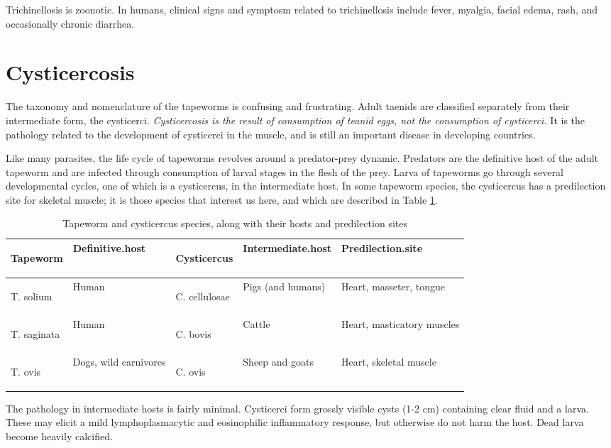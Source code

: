 \documentclass[openany]{book}
\begin{document}
Trichinellosis is zoonotic. In humans, clinical signs and symptosm
related to trichinellosis include fever, myalgia, facial edema, rash,
and occasionally chronic diarrhea.

\section{Cysticercosis}\label{cysticercosis}

The taxonomy and nomenclature of the tapeworms is confusing and
frustrating. Adult taenids are classified separately from their
intermediate form, the cysticerci. \emph{Cysticercosis is the result of
consumption of teanid eggs, not the consumption of cysticerci.} It is
the pathology related to the development of cysticerci in the muscle,
and is still an important disease in developing countries.

Like many parasites, the life cycle of tapeworms revolves around a
predator-prey dynamic. Predators are the definitive host of the adult
tapeworm and are infected through consumption of larval stages in the
flesh of the prey. Larva of tapeworms go through several developmental
cycles, one of which is a cysticercus, in the intermediate host. In some
tapeworm species, the cysticercus has a predilection site for skeletal
muscle; it is those species that interest us here, and which are
described in Table \ref{tab:cysti}.

\begin{table}[t]

\caption{\label{tab:cysti}Tapeworm and cysticercus species, along with their hosts and predilection sites}
\centering
\begin{tabular}{>{\em\raggedright\arraybackslash}p{5em}>{\raggedright\arraybackslash}p{10em}>{\em\raggedright\arraybackslash}p{7em}>{\raggedright\arraybackslash}p{6em}l}
\toprule
Tapeworm & Definitive.host & Cysticercus & Intermediate.host & Predilection.site\\
\midrule
T. solium & Human & C. cellulosae & Pigs (and humans) & Heart, masseter, tongue\\
T. saginata & Human & C. bovis & Cattle & Heart, masticatory muscles\\
T. ovis & Dogs, wild carnivores & C. ovis & Sheep and goats & Heart, skeletal muscle\\
\bottomrule
\end{tabular}
\end{table}

The pathology in intermediate hosts is fairly minimal. Cysticerci form
grossly visible cysts (1-2 cm) containing clear fluid and a larva. These
may elicit a mild lymphoplasmacytic and eosinophilic inflammatory
response, but otherwise do not harm the host. Dead larva become heavily
calcified.
\end{document}
